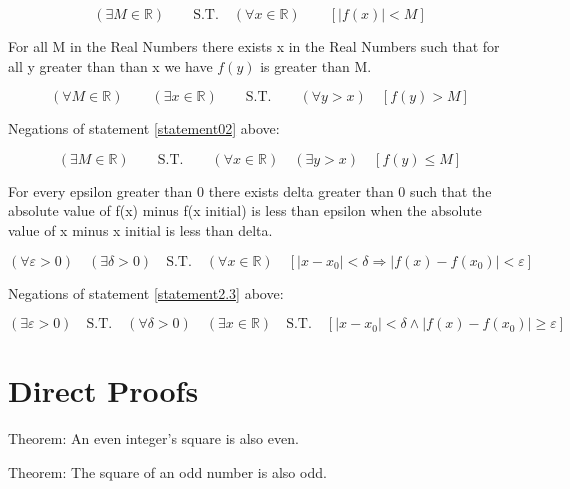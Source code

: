 \begin{equation*}
  (\exists M \in \mathbb{R})\qquad \text{S.T.}\quad (\forall x \in \mathbb{R})\qquad  [|f(x)| < M]
\end{equation*}

\vspace{10 mm}

For all M in the Real Numbers there exists x in the Real Numbers such that for all y greater than than x we have $f(y)$ is greater than M.

\begin{equation}
  (\forall M \in \mathbb{R})\qquad (\exists x \in \mathbb{R})\qquad \text{S.T.}\qquad (\forall y > x)\quad [f(y) > M]  
  \label{statement02}
\end{equation}

Negations of statement \ref{statement02} above:

\begin{equation*}
  (\exists M \in \mathbb{R})\qquad \text{S.T.}\qquad (\forall x \in \mathbb{R})\quad (\exists y > x)\quad [f(y) \leq M]
\end{equation*}

For every epsilon greater than 0 there exists delta greater than 0 such that the absolute value of f(x) minus f(x initial) is less than epsilon when the absolute value of x minus x initial is less than delta.

\begin{equation}
  (\forall \varepsilon > 0)\quad (\exists \delta > 0)\quad \text{S.T.} \quad (\forall x \in \mathbb{R})\quad [|x-x_{0}| < \delta \Longrightarrow |f(x)-f(x_{0})| < \varepsilon]
  \label{statement2.3}
\end{equation}

Negations of statement \ref{statement2.3} above:

\begin{equation*}
  (\exists \varepsilon > 0)\quad \text{S.T.}\quad (\forall \delta >0)\quad (\exists x \in \mathbb{R})\quad \text{S.T.}\quad [|x-x_{0}| < \delta \wedge |f(x)-f(x_{0})| \geq \varepsilon]
\end{equation*}

\section{Direct Proofs}

Theorem: An even integer's square is also even.

Theorem: The square of an odd number is also odd.

